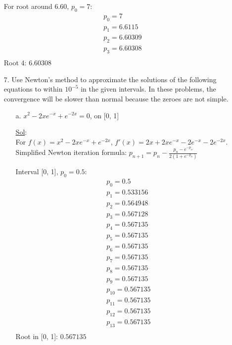 \begin{enumerate}
    For root around 6.60, \( p_0 = 7 \):
    \[
      \begin{array}{l}
        p_0 = 7 \\
        p_1 = 6.6115 \\
        p_2 = 6.60309 \\
        p_3 = 6.60308 \\
      \end{array}
    \]
    Root 4: \( \boxed{6.60308} \)

  \item[7.] Use Newton's method to approximate the solutions of the
    following equations to within \( 10^{-5} \) in the given
    intervals. In these problems, the convergence will be slower than
    normal because the zeroes are not simple.
    \begin{enumerate}
      \item[a.] \( x^2 - 2xe^{-x} + e^{-2x} = 0 \), on [0, 1]

        \underline{Sol}:\\
        For \( f(x) = x^2 - 2xe^{-x} + e^{-2x} \), \( f'(x) = 2x +
        2xe^{-x} - 2e^{-x} - 2e^{-2x} \).
        Simplified Newton iteration formula: \( p_{n+1} = p_n -
        \frac{p_n - e^{-p_n}}{2 (1 + e^{-p_n})} \)

        Interval [0, 1], \( p_0 = 0.5 \):
        \[
          \begin{array}{l}
            p_0 = 0.5 \\
            p_1 = 0.533156 \\
            p_2 = 0.564948 \\
            p_3 = 0.567128 \\
            p_4 = 0.567135 \\
            p_5 = 0.567135 \\
            p_6 = 0.567135 \\
            p_7 = 0.567135 \\
            p_8 = 0.567135 \\
            p_9 = 0.567135 \\
            p_{10} = 0.567135 \\
            p_{11} = 0.567135 \\
            p_{12} = 0.567135 \\
            p_{13} = 0.567135 \\
          \end{array}
        \]
        Root in [0, 1]: \( \boxed{0.567135} \)

    \end{enumerate}


\end{enumerate}
